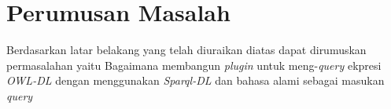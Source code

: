 \section{Perumusan Masalah}
Berdasarkan latar belakang yang telah diuraikan diatas dapat dirumuskan permasalahan yaitu Bagaimana membangun \emph{plugin} untuk meng-\emph{query} ekpresi \emph{OWL-DL} dengan menggunakan \emph{Sparql-DL} dan bahasa alami sebagai masukan \emph{query}
	
